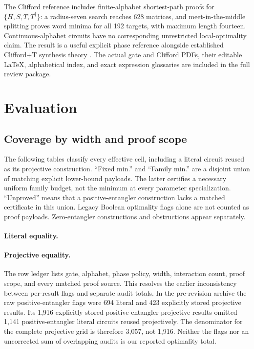 \documentclass[11pt]{article}
\begin{document}
The Clifford reference includes finite-alphabet shortest-path proofs for
$\{H,S,T,T^\dagger\}$: a radius-seven search reaches 628 matrices, and
meet-in-the-middle splitting proves word minima for all 192 targets, with
maximum length fourteen. Continuous-alphabet circuits have no corresponding
unrestricted local-optimality claim. The result is a useful explicit phase
reference alongside established Clifford+T synthesis theory
\cite{matsumoto,kmm,giles,gilesma}. The actual gate and Clifford PDFs, their
editable LaTeX, alphabetical index, and exact expression glossaries are
included in the full review package.

\section{Evaluation}
\subsection{Coverage by width and proof scope}
The following tables classify every effective cell, including a literal
circuit reused as its projective construction. ``Fixed min.'' and ``Family
min.'' are a disjoint union of matching explicit lower-bound payloads. The
latter certifies a necessary uniform family budget, not the minimum at every
parameter specialization. ``Unproved'' means that a positive-entangler
construction lacks a matched certificate in this union. Legacy Boolean
optimality flags alone are not counted as proof payloads. Zero-entangler
constructions and obstructions appear separately.
\paragraph{Literal equality.}
\paragraph{Projective equality.}
The row ledger lists gate, alphabet, phase policy, width, interaction count,
proof scope, and every matched proof source. This resolves the earlier
inconsistency between per-result flags and separate audit totals. In the
pre-revision archive the raw positive-entangler flags were 694 literal and
423 explicitly stored projective results. Its 1,916 explicitly stored
positive-entangler projective results omitted 1,141 positive-entangler
literal circuits reused projectively. The denominator for the complete
projective grid is therefore 3,057, not 1,916. Neither the flags nor an
uncorrected sum of overlapping audits is our reported optimality total.
\end{document}
